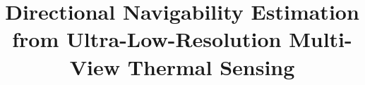 \documentclass[conference,a4paper]{IEEEtran}
\begin{document}
%
\title{Directional Navigability Estimation from Ultra-Low-Resolution Multi-View Thermal Sensing}



\author{
}


% 








\maketitle
\end{document}
